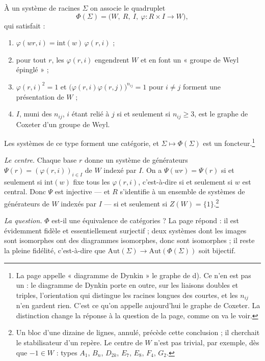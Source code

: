 \documentclass[11pt,a4paper]{article}
\begin{document}
À un système de racines $\Sigma$ on associe le quadruplet
\[
  \Phi(\Sigma) = \bigl(W,\ R,\ I,\ \varphi : R \times I \to W\bigr),
\]
qui satisfait :
\begin{enumerate}
\item[a)] $\varphi(wr, i) = \mathrm{int}(w)\,\varphi(r,i)$ ;
\item[b)] pour tout $r$, les $\varphi(r,i)$ engendrent $W$ et en font un
« groupe de Weyl épinglé » ;
\item[c)] $\varphi(r,i)^{2} = 1$ et $\bigl(\varphi(r,i)\varphi(r,j)\bigr)^{n_{ij}}
= 1$ pour $i \neq j$ forment une présentation de $W$ ;
\item[d)] $I$, muni des $n_{ij}$, $i$ étant relié à $j$ si et seulement si
$n_{ij} \geq 3$, est le graphe de Coxeter d'un groupe de Weyl.
\end{enumerate}
Les systèmes de ce type forment une catégorie, et $\Sigma \mapsto \Phi(\Sigma)$
est un foncteur.\footnote{La page appelle « diagramme de Dynkin » le graphe de
d). Ce n'en est pas un : le diagramme de Dynkin porte en outre, sur les liaisons
doubles et triples, l'orientation qui distingue les racines longues des
courtes, et les $n_{ij}$ n'en gardent rien. C'est ce qu'on appelle aujourd'hui
le graphe de Coxeter. La distinction change la réponse à la question de la page,
comme on va le voir.}

\emph{Le centre.} Chaque base $r$ donne un système de générateurs
$\Psi(r) = (\varphi(r,i))_{i \in I}$ de $W$ indexé par $I$. On a
$\Psi(wr) = \Psi(r)$ si et seulement si $\mathrm{int}(w)$ fixe tous les
$\varphi(r,i)$, c'est-à-dire si et seulement si $w$ est central. Donc $\Psi$
est injective --- et $R$ s'identifie à un ensemble de systèmes de générateurs
de $W$ indexés par $I$ --- si et seulement si $Z(W) = \{1\}$.\footnote{Un bloc
d'une dizaine de lignes, annulé, précède cette conclusion ; il cherchait le
stabilisateur d'un repère. Le centre de $W$ n'est pas trivial, par exemple,
dès que $-1 \in W$ : types $A_{1}$, $B_{n}$, $D_{2k}$, $E_{7}$, $E_{8}$, $F_{4}$,
$G_{2}$.}

\emph{La question.} $\Phi$ est-il une équivalence de catégories ? La page
répond : il est évidemment fidèle et essentiellement surjectif ; deux systèmes
dont les images sont isomorphes ont des diagrammes isomorphes, donc sont
isomorphes ; il reste la pleine fidélité, c'est-à-dire que
$\mathrm{Aut}(\Sigma) \to \mathrm{Aut}(\Phi(\Sigma))$ soit bijectif.
\end{document}
